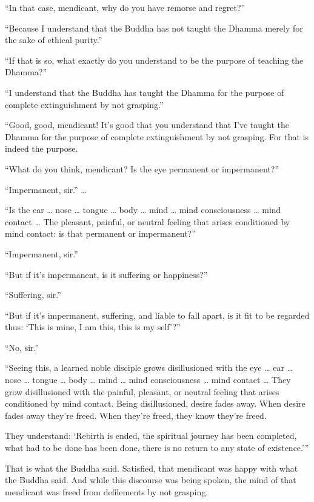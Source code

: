 \documentclass[12pt,openany]{book}%
\begin{document}
“In that case, mendicant, why do you have remorse and regret?” 

“Because I understand that the Buddha has not taught the Dhamma merely for the sake of ethical purity.” 

“If that is so, what exactly do you understand to be the purpose of teaching the Dhamma?” 

“I understand that the Buddha has taught the Dhamma for the purpose of complete extinguishment by not grasping.” 

“Good, good, mendicant! It’s good that you understand that I’ve taught the Dhamma for the purpose of complete extinguishment by not grasping. For that is indeed the purpose. 

“What do you think, mendicant? Is the eye permanent or impermanent?” 

“Impermanent, sir.” … 

“Is the ear … nose … tongue … body … mind … mind consciousness … mind contact … The pleasant, painful, or neutral feeling that arises conditioned by mind contact: is that permanent or impermanent?” 

“Impermanent, sir.” 

“But if it’s impermanent, is it suffering or happiness?” 

“Suffering, sir.” 

“But if it’s impermanent, suffering, and liable to fall apart, is it fit to be regarded thus: ‘This is mine, I am this, this is my self’?” 

“No, sir.” 

“Seeing this, a learned noble disciple grows disillusioned with the eye … ear … nose … tongue … body … mind … mind consciousness … mind contact … They grow disillusioned with the painful, pleasant, or neutral feeling that arises conditioned by mind contact. Being disillusioned, desire fades away. When desire fades away they’re freed. When they’re freed, they know they’re freed. 

They understand: ‘Rebirth is ended, the spiritual journey has been completed, what had to be done has been done, there is no return to any state of existence.’” 

That is what the Buddha said. Satisfied, that mendicant was happy with what the Buddha said. And while this discourse was being spoken, the mind of that mendicant was freed from defilements by not grasping. 
\end{document}
